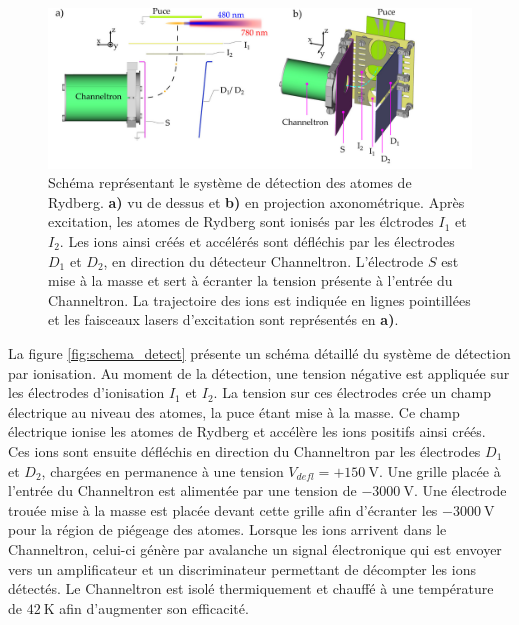 %
\begin{figure}[h]
\centering
\includegraphics[width=\linewidth]{figures/schema_detect}
\caption[Système de détection des atomes de Rydberg]{Schéma représentant le système de détection des atomes de Rydberg.
\textbf{a)} vu de dessus et \textbf{b)} en projection axonométrique.
Après excitation, les atomes de Rydberg sont ionisés par les élctrodes $I_1$ et $I_2$.
Les ions ainsi créés et accélérés sont défléchis par les électrodes $D_1$ et $D_2$, en direction du détecteur Channeltron.
L'électrode $S$ est mise à la masse et sert à écranter la tension présente à l'entrée du Channeltron.
La trajectoire des ions est indiquée en lignes pointillées et les faisceaux lasers d'excitation sont représentés en \textbf{a)}.
}
\label{fig:schema_detect}
\end{figure}
%
La figure \eqref{fig:schema_detect} présente un schéma détaillé du système de détection par ionisation.
Au moment de la détection, une tension négative est appliquée sur les électrodes d'ionisation $I_1$ et $I_2$.
La tension sur ces électrodes crée un champ électrique au niveau des atomes, la puce étant mise à la masse.
Ce champ électrique ionise les atomes de Rydberg et accélère les ions positifs ainsi créés.
Ces ions sont ensuite défléchis en direction du Channeltron par les électrodes $D_1$ et $D_2$, chargées en permanence à une tension $V_{defl} = +\SI{150}{\V}$.
Une grille placée à l'entrée du Channeltron est alimentée par une tension de $\SI{-3000}{\V}$.
Une électrode trouée mise à la masse est placée devant cette grille afin d'écranter les $\SI{-3000}{\V}$ pour la région de piégeage des atomes.
Lorsque les ions arrivent dans le Channeltron, celui-ci génère par avalanche un signal électronique qui est envoyer vers un amplificateur et un discriminateur permettant de décompter les ions détectés.
Le Channeltron est isolé thermiquement et chauffé à une température de $\SI{42}{\K}$ afin d'augmenter son efficacité.

